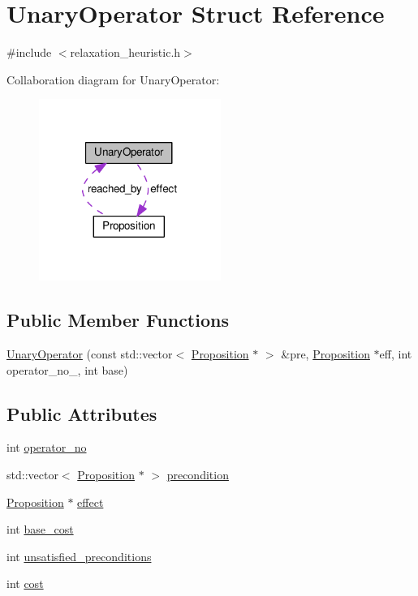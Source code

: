 \hypertarget{structUnaryOperator}{\section{Unary\-Operator Struct Reference}
\label{structUnaryOperator}
}


{\ttfamily \#include $<$relaxation\-\_\-heuristic.\-h$>$}



Collaboration diagram for Unary\-Operator\-:
\nopagebreak
\begin{figure}[H]
\begin{center}
\leavevmode
\includegraphics[width=168pt]{structUnaryOperator__coll__graph}
\end{center}
\end{figure}
\subsection*{Public Member Functions}
\begin{DoxyCompactItemize}
\item 
\hyperlink{structUnaryOperator_a0dab651e89564afdc1d342ed32db5d50}{Unary\-Operator} (const std\-::vector$<$ \hyperlink{structProposition}{Proposition} $\ast$ $>$ \&pre, \hyperlink{structProposition}{Proposition} $\ast$eff, int operator\-\_\-no\-\_\-, int base)
\end{DoxyCompactItemize}
\subsection*{Public Attributes}
\begin{DoxyCompactItemize}
\item 
int \hyperlink{structUnaryOperator_a02e00e6744c15a0789b0c268e5dda66c}{operator\-\_\-no}
\item 
std\-::vector$<$ \hyperlink{structProposition}{Proposition} $\ast$ $>$ \hyperlink{structUnaryOperator_aaadd10ce211907ef447f2e626c1e0844}{precondition}
\item 
\hyperlink{structProposition}{Proposition} $\ast$ \hyperlink{structUnaryOperator_ab8cc5c54af7d951a2cf943e142fff161}{effect}
\item 
int \hyperlink{structUnaryOperator_a77481176cd0816de1c1ef04e823b6921}{base\-\_\-cost}
\item 
int \hyperlink{structUnaryOperator_ae83816ce19b9d4cf8878553cae81ba98}{unsatisfied\-\_\-preconditions}
\item 
int \hyperlink{structUnaryOperator_acefd9a91627285c504c3cc1a7626d0ae}{cost}
\end{DoxyCompactItemize}


